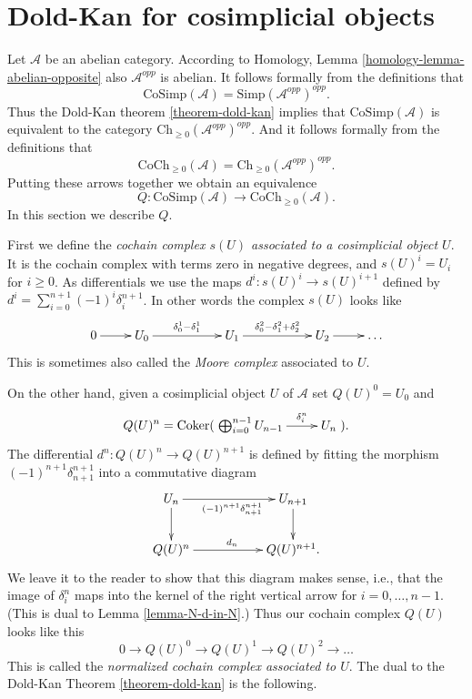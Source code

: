 \section{Dold-Kan for cosimplicial objects}
\label{section-dold-kan-cosimplicial}

\noindent
Let $\mathcal{A}$ be an abelian category.
According to Homology, Lemma \ref{homology-lemma-abelian-opposite}
also $\mathcal{A}^{opp}$ is abelian. It follows
formally from the definitions that
$$
\text{CoSimp}(\mathcal{A}) = \text{Simp}(\mathcal{A}^{opp})^{opp}.
$$
Thus the Dold-Kan theorem \ref{theorem-dold-kan} implies
that $\text{CoSimp}(\mathcal{A})$ is equivalent to
the category
$\text{Ch}_{\geq 0}(\mathcal{A}^{opp})^{opp}$. And it
follows formally from the definitions that
$$
\text{CoCh}_{\geq 0}(\mathcal{A}) =
\text{Ch}_{\geq 0}(\mathcal{A}^{opp})^{opp}.
$$
Putting these arrows together we obtain an equivalence
$$
Q :
\text{CoSimp}(\mathcal{A})
\longrightarrow
\text{CoCh}_{\geq 0}(\mathcal{A}).
$$
In this section we describe $Q$.

\medskip\noindent
First we define the
{\it cochain complex $s(U)$ associated to a cosimplicial
object $U$}. It is the cochain complex with terms zero in
negative degrees, and $s(U)^i = U_i$ for $i \geq 0$.
As differentials we use the maps
$d^i : s(U)^i \to s(U)^{i + 1}$ defined by
$d^i = \sum_{i = 0}^{n + 1} (-1)^i \delta^{n + 1}_i$.
In other words the complex $s(U)$ looks like
$$
\xymatrix{
0 \ar[r] &
U_0 \ar[rr]^{\delta^1_0 - \delta^1_1} & &
U_1 \ar[rr]^{\delta^2_0 - \delta^2_1 + \delta^2_2} & &
U_2 \ar[r] &
\ldots
}
$$
This is sometimes also called the {\it Moore complex} associated
to $U$.

\medskip\noindent
On the other hand, given a
cosimplicial object $U$ of $\mathcal{A}$ set
$Q(U)^0 = U_0$ and 
$$
Q(U)^n = \text{Coker}(
\xymatrix{
\bigoplus_{i = 0}^{n - 1} U_{n - 1} \ar[r]^-{\delta^n_i} &
U_n
}).
$$
The differential $d^n : Q(U)^n \to Q(U)^{n + 1}$
is defined by fitting the morphism
$(-1)^{n + 1}\delta^{n + 1}_{n + 1}$ into a commutative
diagram
$$
\xymatrix{
U_n \ar[rr]_{(-1)^{n + 1}\delta^{n + 1}_{n + 1}} \ar[d] & &
U_{n + 1} \ar[d] \\
Q(U)^n \ar[rr]^{d_n} & &
Q(U)^{n + 1}.
}
$$
We leave it to the reader to show that this diagram makes
sense, i.e., that the image of $\delta^n_i$ maps into
the kernel of the right vertical arrow for $i = 0, \ldots, n - 1$.
(This is dual to Lemma \ref{lemma-N-d-in-N}.)
Thus our cochain complex $Q(U)$ looks like this
$$
0 \to Q(U)^0 \to Q(U)^1 \to Q(U)^2 \to \ldots
$$
This is called the {\it normalized cochain complex associated
to $U$}.
The dual to the Dold-Kan Theorem \ref{theorem-dold-kan} is the following.

